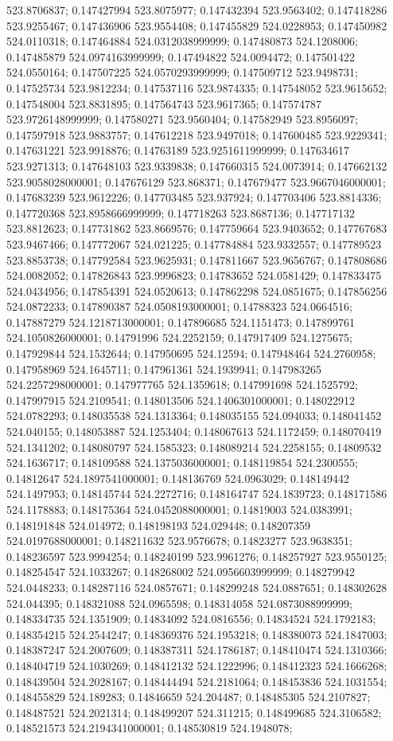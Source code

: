 523.8706837; 0.147427994 523.8075977; 0.147432394 523.9563402; 0.147418286 523.9255467; 0.147436906 523.9554408; 0.147455829 524.0228953; 0.147450982 524.0110318; 0.147464884 524.0312038999999; 0.147480873 524.1208006; 0.147485879 524.0974163999999; 0.147494822 524.0094472; 0.147501422 524.0550164; 0.147507225 524.0570293999999; 0.147509712 523.9498731; 0.147525734 523.9812234; 0.147537116 523.9874335; 0.147548052 523.9615652; 0.147548004 523.8831895; 0.147564743 523.9617365; 0.147574787 523.9726148999999; 0.147580271 523.9560404; 0.147582949 523.8956097; 0.147597918 523.9883757; 0.147612218 523.9497018; 0.147600485 523.9229341; 0.147631221 523.9918876; 0.14763189 523.9251611999999; 0.147634617 523.9271313; 0.147648103 523.9339838; 0.147660315 524.0073914; 0.147662132 523.9058028000001; 0.147676129 523.868371; 0.147679477 523.9667046000001; 0.147683239 523.9612226; 0.147703485 523.937924; 0.147703406 523.8814336; 0.147720368 523.8958666999999; 0.147718263 523.8687136; 0.147717132 523.8812623; 0.147731862 523.8669576; 0.147759664 523.9403652; 0.147767683 523.9467466; 0.147772067 524.021225; 0.147784884 523.9332557; 0.147789523 523.8853738; 0.147792584 523.9625931; 0.147811667 523.9656767; 0.147808686 524.0082052; 0.147826843 523.9996823; 0.14783652 524.0581429; 0.147833475 524.0434956; 0.147854391 524.0520613; 0.147862298 524.0851675; 0.147856256 524.0872233; 0.147890387 524.0508193000001; 0.14788323 524.0664516; 0.147887279 524.1218713000001; 0.147896685 524.1151473; 0.147899761 524.1050826000001; 0.14791996 524.2252159; 0.147917409 524.1275675; 0.147929844 524.1532644; 0.147950695 524.12594; 0.147948464 524.2760958; 0.147958969 524.1645711; 0.147961361 524.1939941; 0.147983265 524.2257298000001; 0.147977765 524.1359618; 0.147991698 524.1525792; 0.147997915 524.2109541; 0.148013506 524.1406301000001; 0.148022912 524.0782293; 0.148035538 524.1313364; 0.148035155 524.094033; 0.148041452 524.040155; 0.148053887 524.1253404; 0.148067613 524.1172459; 0.148070419 524.1341202; 0.148080797 524.1585323; 0.148089214 524.2258155; 0.14809532 524.1636717; 0.148109588 524.1375036000001; 0.148119854 524.2300555; 0.14812647 524.1897541000001; 0.148136769 524.0963029; 0.148149442 524.1497953; 0.148145744 524.2272716; 0.148164747 524.1839723; 0.148171586 524.1178883; 0.148175364 524.0452088000001; 0.14819003 524.0383991; 0.148191848 524.014972; 0.148198193 524.029448; 0.148207359 524.0197688000001; 0.148211632 523.9576678; 0.14823277 523.9638351; 0.148236597 523.9994254; 0.148240199 523.9961276; 0.148257927 523.9550125; 0.148254547 524.1033267; 0.148268002 524.0956603999999; 0.148279942 524.0448233; 0.148287116 524.0857671; 0.148299248 524.0887651; 0.148302628 524.044395; 0.148321088 524.0965598; 0.148314058 524.0873088999999; 0.148334735 524.1351909; 0.14834092 524.0816556; 0.14834524 524.1792183; 0.148354215 524.2544247; 0.148369376 524.1953218; 0.148380073 524.1847003; 0.148387247 524.2007609; 0.148387311 524.1786187; 0.148410474 524.1310366; 0.148404719 524.1030269; 0.148412132 524.1222996; 0.148412323 524.1666268; 0.148439504 524.2028167; 0.148444494 524.2181064; 0.148453836 524.1031554; 0.148455829 524.189283; 0.14846659 524.204487; 0.148485305 524.2107827; 0.148487521 524.2021314; 0.148499207 524.311215; 0.148499685 524.3106582; 0.148521573 524.2194341000001; 0.148530819 524.1948078; 